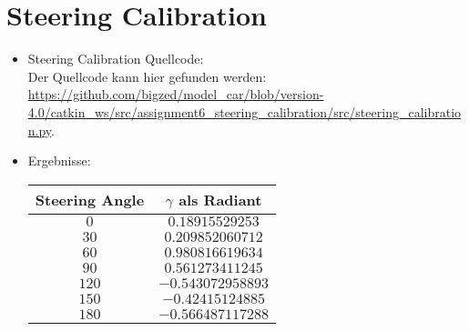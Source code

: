 \documentclass[10pt,oneside,a4paper]{article}
\begin{document}
  \section{Steering Calibration}
    \begin{itemize}
      \item Steering Calibration Quellcode:\\
        Der Quellcode kann hier gefunden werden:
        \url{https://github.com/bigzed/model_car/blob/version-4.0/catkin_ws/src/assignment6_steering_calibration/src/steering_calibration.py}.
      \item Ergebnisse:\\
        \begin{tabular}{c|c}
          Steering Angle & $\gamma$ als Radiant \\ \hline \hline
          $0$ & $0.18915529253$\\
          $30$ & $0.209852060712$\\
          $60$ & $0.980816619634$\\
          $90$ & $0.561273411245$\\
          $120$ & $-0.543072958893$\\
          $150$ & $-0.42415124885$\\
          $180$ & $-0.566487117288$
        \end{tabular}
  \end{itemize}
\end{document}
